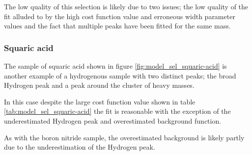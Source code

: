 \documentclass[a4paper]{article}
\begin{document}
The low quality of this selection is likely due to two issues; the low quality
of the fit alluded to by the high cost function value and erroneous width
parameter values and the fact that multiple peaks have been fitted for the same
mass.

\subsubsection{Squaric acid}

The sample of squaric acid shown in figure \ref{fig:model_sel_squaric-acid} is
another example of a hydrogenous sample with two distinct peaks; the broad
Hydrogen peak and a peak around the cluster of heavy masses.

In this case despite the large cost function value shown in table
\ref{tab:model_sel_squaric-acid} the fit is reasonable with the exception of the
underestimated Hydrogen peak and overestimated background function.

As with the boron nitride sample, the overestimated background is likely partly
due to the underestimation of the Hydrogen peak.
\end{document}
